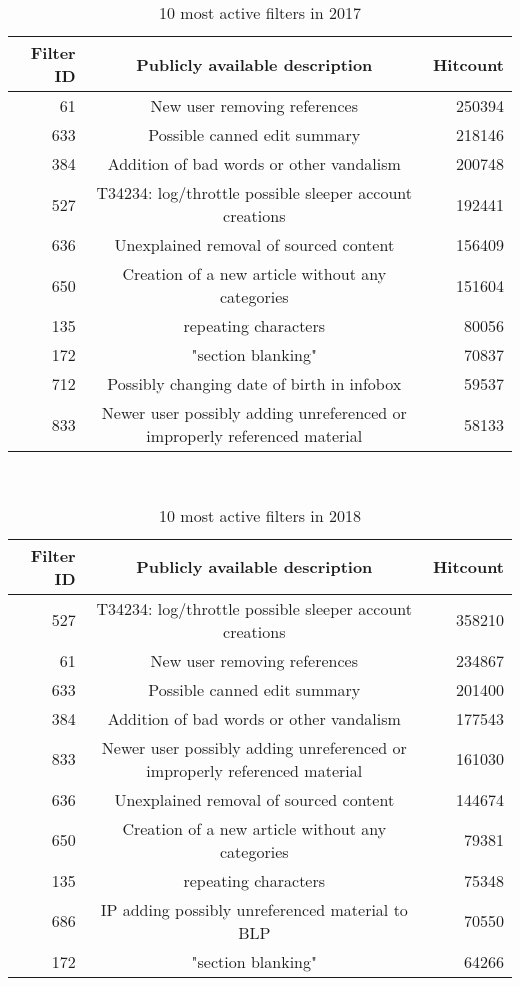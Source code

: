 \begin{table}
  \centering
  \begin{tabular}{r c r }
    Filter ID & Publicly available description & Hitcount \\
    \hline
    61 & New user removing references & 250394 \\
    633 & Possible canned edit summary & 218146 \\
    384 & Addition of bad words or other vandalism & 200748 \\
    527 & T34234: log/throttle possible sleeper account creations & 192441 \\
    636 & Unexplained removal of sourced content & 156409 \\
    650 & Creation of a new article without any categories & 151604 \\
    135 & repeating characters & 80056 \\
    172 & "section blanking" & 70837 \\
    712 & Possibly changing date of birth in infobox & 59537 \\
    833 & Newer user possibly adding unreferenced or improperly referenced material & 58133 \\
  \end{tabular}
  \caption{10 most active filters in 2017}~\label{tab:most-active-2017}
\end{table}

\begin{table}
  \centering
  \begin{tabular}{r c r }
    Filter ID & Publicly available description & Hitcount \\
    \hline
    527 & T34234: log/throttle possible sleeper account creations & 358210 \\
    61 & New user removing references & 234867 \\
    633 & Possible canned edit summary & 201400 \\
    384 & Addition of bad words or other vandalism & 177543 \\
    833 & Newer user possibly adding unreferenced or improperly referenced material & 161030 \\
    636 & Unexplained removal of sourced content & 144674 \\
    650 & Creation of a new article without any categories & 79381 \\
    135 & repeating characters & 75348 \\
    686 & IP adding possibly unreferenced material to BLP & 70550 \\
    172 & "section blanking" & 64266 \\
  \end{tabular}
  \caption{10 most active filters in 2018}~\label{tab:most-active-2018}
\end{table}

